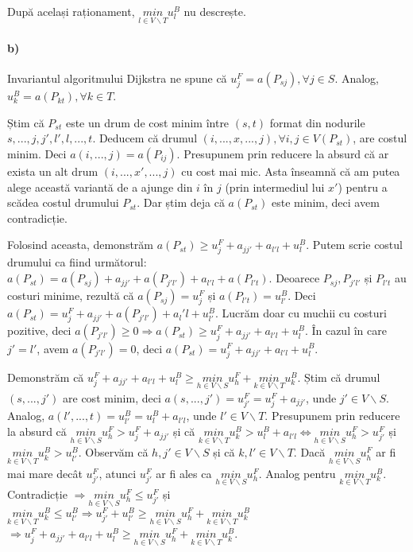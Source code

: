 \documentclass[paper=a4, fontsize=12pt]{scrartcl}
\begin{document}
După același raționament, $\underset{l \in V \backslash T}{min} u^B_l$ nu descrește.

\paragraph{b)}
Invariantul algoritmului Dijkstra ne spune că $u^F_j = a(P_{sj}), \forall j \in S$. Analog, $u^B_k = a(P_{kt}), \forall k \in T$.

Știm că $P_{st}$ este un drum de cost minim între $(s,t)$ format din nodurile $s, ..., j, j', l', l, ..., t$.
Deducem că drumul $(i, ..., x, ..., j), \forall i,j \in V(P_{st})$, are costul minim. Deci $a(i, ..., j) = a(P_{ij})$.
Presupunem prin reducere la absurd că ar exista un alt drum $(i, ..., x', ..., j)$ cu cost mai mic. 
Asta înseamnă că am putea alege această variantă de a ajunge din $i$ în $j$ (prin intermediul lui $x'$) pentru a scădea costul drumului $P_{st}$.
Dar știm deja că $a(P_{st})$ este minim, deci avem contradicție.

Folosind aceasta, demonstrăm $a(P_{st}) \geq u^F_j + a_{jj'} + a_{l'l} + u^B_l$. Putem scrie costul drumului ca fiind următorul: 
$a(P_{st}) = a(P_{sj}) + a_{jj'} + a(P_{j'l'}) + a_{l'l} + a(P_{l't})$. Deoarece $P_{sj}, P_{j'l'}$ și $P_{l't}$ au costuri minime, rezultă că
$a(P_{sj}) = u^F_j$ și $a(P_{l't}) = u^B_{l'}$. Deci $a(P_{st}) = u^F_j + a_{jj'} + a(P_{j'l'}) + a_l'l + u^B_{l'}$.
Lucrăm doar cu muchii cu costuri pozitive, deci $a(P_{j'l'}) \geq 0 \Rightarrow a(P_{st}) \geq u^F_j + a_{jj'} + a_{l'l} + u^B_l$.
În cazul în care $j' = l'$, avem $a(P_{j'l'}) = 0$, deci $a(P_{st}) = u^F_j + a_{jj'} + a_{l'l} + u^B_l$. 

Demonstrăm că $u^F_j + a_{jj'} + a_{l'l} + u^B_l \geq \underset{h \in V \backslash S}{min} u^F_h + \underset{k \in V \backslash T}{min} u^B_k$.
Știm că drumul $(s, ..., j')$ are cost minim, deci $a(s, ..., j') = u^F_{j'} = u^F_j + a_{jj'}$, unde $j' \in V \backslash S$.
Analog, $a(l', ..., t) = u^B_{l'} = u^B_l + a_{l'l}$, unde $l' \in V \backslash T$. Presupunem prin reducere la absurd că
$\underset{h \in V \backslash S}{min} u^F_h > u^F_j + a_{jj'}$ și că 
$\underset{k \in V \backslash T}{min} u^B_k > u^B_l + a_{l'l} \Leftrightarrow \underset{h \in V \backslash S}{min} u^F_h > u^F_{j'}$ și $\underset{k \in V \backslash T}{min} u^B_k > u^B_{l'}$.
Observăm că $h, j' \in V \backslash S$ și că $k, l' \in V \backslash T$. Dacă $\underset{h \in V \backslash S}{min} u^F_h$ ar fi mai mare decât $u^F_{j'}$, atunci
$u^F_{j'}$ ar fi ales ca $\underset{h \in V \backslash S}{min} u^F_h$. Analog pentru $\underset{k \in V \backslash T}{min} u^B_k$. Contradicție 
$\Rightarrow \underset{h \in V \backslash S}{min} u^F_h \leq u^F_{j'}$ și
$\underset{k \in V \backslash T}{min} u^B_k \leq u^B_{l'} \Rightarrow u^F_{j'} + u^B_{l'} \geq \underset{h \in V \backslash S}{min} u^F_h + \underset{k \in V \backslash T}{min} u^B_k$
$\Rightarrow u^F_j + a_{jj'} + a_{l'l} + u^B_l \geq \underset{h \in V \backslash S}{min} u^F_h + \underset{k \in V \backslash T}{min} u^B_k$.
\end{document}
